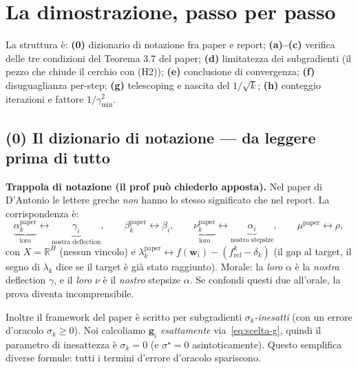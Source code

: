 \documentclass[11pt,a4paper]{article}
\theoremstyle{definition}
\newcommand{\w}{\bm{w}}
\newcommand{\g}{\bm{g}}
\newcommand{\gmin}{\gamma_{\min}}
\newcommand{\R}{\mathbb{R}}
\begin{document}
\section{La dimostrazione, passo per passo}
\label{sec:prova}

La struttura è: \textbf{(0)} dizionario di notazione fra paper e report; \textbf{(a)--(c)}
verifica delle tre condizioni del Teorema 3.7 del paper; \textbf{(d)} limitatezza dei
subgradienti (il pezzo che chiude il cerchio con (H2)); \textbf{(e)} conclusione di
convergenza; \textbf{(f)} disuguaglianza per-step; \textbf{(g)} telescoping e nascita del
$1/\sqrt{k}$; \textbf{(h)} conteggio iterazioni e fattore $1/\gmin^2$.

\subsection{(0) Il dizionario di notazione --- da leggere prima di tutto}
\label{sub:dizionario}

\begin{warnbox}
\textbf{Trappola di notazione (il prof può chiederlo apposta).} Nel paper di D'Antonio le
lettere greche \emph{non} hanno lo stesso significato che nel report. La corrispondenza è:
\[
\underbrace{\alpha_k^{\text{paper}}}_{\text{loro}} \leftrightarrow \underbrace{\gamma_i}_{\text{nostra deflection}},
\qquad
\beta_k^{\text{paper}} \leftrightarrow \beta_i,
\qquad
\underbrace{\nu_k^{\text{paper}}}_{\text{loro}} \leftrightarrow \underbrace{\alpha_i}_{\text{nostro stepsize}},
\qquad
\mu^{\text{paper}}\leftrightarrow\rho,
\]
con $X=\R^H$ (nessun vincolo) e
$\lambda_k^{\text{paper}}\leftrightarrow f(\w_i)-(f^k_{\mathrm{ref}}-\delta_k)$ (il gap al
target, il segno di $\lambda_k$ dice se il target è già stato raggiunto). Morale: la
\emph{loro} $\alpha$ è la \emph{nostra} deflection $\gamma$, e il \emph{loro} $\nu$ è il
\emph{nostro} stepsize $\alpha$. Se confondi questi due all'orale, la prova diventa
incomprensibile.
\end{warnbox}

Inoltre il framework del paper è scritto per subgradienti \emph{$\sigma_k$-inesatti} (con un
errore d'oracolo $\sigma_k\ge0$). Noi calcoliamo $\g_i$ \emph{esattamente}
via~\eqref{eq:scelta-g}, quindi il parametro di inesattezza è $\sigma_k=0$ (e $\sigma^\star=0$
asintoticamente). Questo semplifica diverse formule: tutti i termini d'errore d'oracolo
spariscono.
\end{document}
